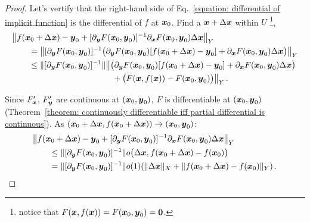 \documentclass[openany]{book}
\begin{document}
\begin{proof}
	Let's vertify that the right-hand side of Eq.~\eqref{equation: differential of implicit function} is the differential of $f$ at $\boldsymbol{x}_0$. 
	Find a $\boldsymbol{x} + \Delta \boldsymbol{x}$ within $U$%
		\footnote{notice that $F(\boldsymbol{x}, f(\boldsymbol{x})) = F(\boldsymbol{x}_0, \boldsymbol{y}_0) = \boldsymbol{0}$.},
	\begin{align*}
		&\big\| f(\boldsymbol{x}_0 + \Delta \boldsymbol{x}) - \boldsymbol{y}_0 
		+ [\partial_{\boldsymbol{y}} F(\boldsymbol{x}_0, \boldsymbol{y}_0)]^{-1} \partial_{\boldsymbol{x}} F(\boldsymbol{x}_0, \boldsymbol{y}_0) 
			\Delta \boldsymbol{x} \big\|_Y
		\\&\qquad
		= \left\| [\partial_{\boldsymbol{y}} F(\boldsymbol{x}_0, \boldsymbol{y}_0)]^{-1}
			\big(
				\partial_{\boldsymbol{y}} F(\boldsymbol{x}_0, \boldsymbol{y}_0) [f(\boldsymbol{x}_0 + \Delta \boldsymbol{x}) - \boldsymbol{y}_0] 
				+ \partial_{\boldsymbol{x}} F(\boldsymbol{x}_0, \boldsymbol{y}_0) \Delta \boldsymbol{x}
			\big)
		\right\|_Y 
		\\&\qquad
		\leq  \| [\partial_{\boldsymbol{y}} F(\boldsymbol{x}_0, \boldsymbol{y}_0)]^{-1} \|
			\big\| \big(
				\partial_{\boldsymbol{y}} F(\boldsymbol{x}_0, \boldsymbol{y}_0) [f(\boldsymbol{x}_0 + \Delta \boldsymbol{x}) - \boldsymbol{y}_0] 
				+ \partial_{\boldsymbol{x}} F(\boldsymbol{x}_0, \boldsymbol{y}_0) \Delta \boldsymbol{x}
			\big) 
		\\&\qquad\qquad\qquad\qquad\qquad\qquad
			+ \big( F(\boldsymbol{x}, f(\boldsymbol{x})) - F(\boldsymbol{x}_0, \boldsymbol{y}_0) \big)
			\big\|_Y\,.
	\end{align*}

	Since $F_{\boldsymbol{x}}'$, $F_{\boldsymbol{y}}'$ are continuous at $(\boldsymbol{x}_0, \boldsymbol{y}_0)$, $F$ is differentiable at $(\boldsymbol{x}_0, \boldsymbol{y}_0)$ (Theorem~\ref{theorem: continuously differentiable iff partial differential is continuous}).
	As $(\boldsymbol{x}_0 + \Delta \boldsymbol{x}, f(\boldsymbol{x}_0 + \Delta \boldsymbol{x})) \to (\boldsymbol{x}_0, \boldsymbol{y}_0)$:
	\begin{align*}
		&\big\| f(\boldsymbol{x}_0 + \Delta \boldsymbol{x}) - \boldsymbol{y}_0 
		+ [\partial_{\boldsymbol{y}} F(\boldsymbol{x}_0, \boldsymbol{y}_0)]^{-1} \partial_{\boldsymbol{x}} F(\boldsymbol{x}_0, \boldsymbol{y}_0) 
			\Delta \boldsymbol{x} \big\|_Y
		\\&\qquad
		\leq \| [\partial_{\boldsymbol{y}} F(\boldsymbol{x}_0, \boldsymbol{y}_0)]^{-1} \|
		o\big(\Delta \boldsymbol{x}, f(\boldsymbol{x}_0 + \Delta \boldsymbol{x}) - f(\boldsymbol{x}_0) \big)
		\\&\qquad
		= \| [\partial_{\boldsymbol{y}} F(\boldsymbol{x}_0, \boldsymbol{y}_0)]^{-1} \| o(1) 
			(\|\Delta \boldsymbol{x}\|_X + \|f(\boldsymbol{x}_0 + \Delta \boldsymbol{x}) - f(\boldsymbol{x}_0)\|_Y)\,.
	\end{align*}


\end{proof}
\end{document}

